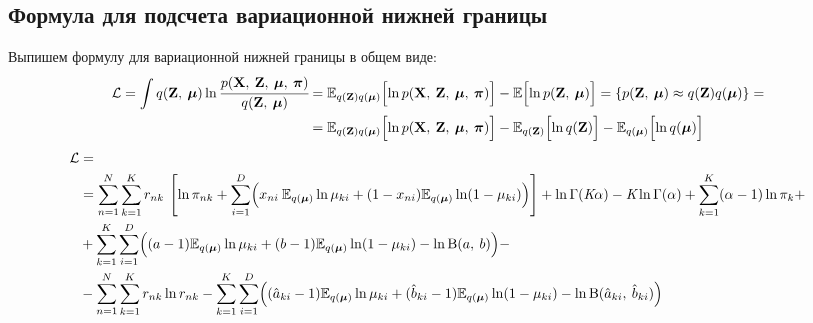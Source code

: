 \documentclass[twoside]{article}
\begin{document}
\subsection{Формула для подсчета вариационной нижней границы}
Выпишем формулу для вариационной нижней границы в общем виде: 
	\begin{align*}
	\mathcal{L} = \int q(\textbf{Z},\:\boldsymbol{\mu}) \ln \cfrac{p(\textbf{X},\: \textbf{Z},\: \boldsymbol\mu,\: \boldsymbol{\pi})}{q(\textbf{Z},\:\boldsymbol{\mu})} &=
	 \mathbb{E}_{q(\textbf{Z})q(\boldsymbol{\mu})}\Bigl[\ln p(\textbf{X},\: \textbf{Z},\: \boldsymbol\mu,\: \boldsymbol{\pi})\Bigr] - \mathbb{E}\Bigl[ \ln p(\textbf{Z},\:\boldsymbol{\mu})\Bigr] = \{p(\textbf{Z},\:\boldsymbol{\mu}) \approx q(\textbf{Z})q(\boldsymbol{\mu})\}  =\\ 
	 &= \mathbb{E}_{q(\textbf{Z})q(\boldsymbol{\mu})} \Bigl[\ln p(\textbf{X},\: \textbf{Z},\: \boldsymbol\mu,\: \boldsymbol{\pi})\Bigr] - \mathbb{E}_{q(\textbf{Z})}\Bigl[ \ln q(\textbf{Z})\Bigr] - \mathbb{E}_{q(\boldsymbol{\mu})} \Bigl[\ln q(\boldsymbol{\mu})\Bigr]
	\end{align*}
	\begin{align*}
		\mathcal{L} &=\\
		&= \sum_{n = 1}^N \sum_{k = 1}^K r_{nk}\:\left[\ln \pi_{nk} +  \sum_{i = 1}^D \Bigl( x_{ni}\: \mathbb{E}_{q(\boldsymbol{\mu})}\ln\mu_{ki} + (1 - x_{ni})\mathbb{E}_{q(\boldsymbol{\mu})}\ln(1-\mu_{ki})\Bigr)\right]
		+ \ln \Gamma(\textit{K}\alpha) - \textit{K}\ln\Gamma(\alpha) +   
		\sum_{k = 1}^K (\alpha - 1)\ln \pi_k + \\ 
		&+ \sum_{k = 1}^K \sum_{i = 1}^D \Bigl( (a - 1)\mathbb{E}_{q(\boldsymbol{\mu})}\ln\mu_{ki} + (b - 1)\mathbb{E}_{q(\boldsymbol{\mu})}\ln(1 - \mu_{ki})- \ln\mathrm{B}(a,\: b)\Bigr) -\\
		&- \sum_{n = 1}^N \sum_{k = 1}^K r_{nk} \ln r_{nk} 
		- \sum_{k = 1}^K \sum_{i = 1}^D \Bigl( (\hat a_{ki} - 1)\mathbb{E}_{q(\boldsymbol{\mu})}\ln\mu_{ki} + (\hat b_{ki} - 1)\mathbb{E}_{q(\boldsymbol{\mu})}\ln(1 - \mu_{ki})- \ln\mathrm{B}(\hat a_{ki},\: \hat b_{ki})\Bigr) 
	\end{align*}
\end{document}
